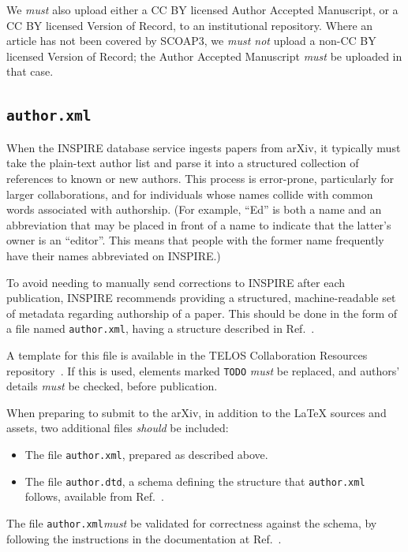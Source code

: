 \documentclass{article}
\newcommand\rfcword[1]{\emph{#1}\xspace}
\newcommand\must{\rfcword{must}}
\newcommand\mustnot{\rfcword{must not}}
\newcommand\should{\rfcword{should}}
\newcommand\filename[1]{\texttt{#1}\xspace}
\newcommand\authorxml{\filename{author.xml}}
\begin{document}
We \must also upload either a CC BY licensed Author Accepted Manuscript,
or a CC BY licensed Version of Record,
to an institutional repository.
Where an article has not been covered by SCOAP3,
we \mustnot upload a non-CC BY licensed Version of Record;
the Author Accepted Manuscript \must be uploaded in that case.


\subsection{\authorxml}

When the INSPIRE database service ingests papers from arXiv,
it typically must take the plain-text author list
and parse it into a structured collection of references to known or new authors.
This process is error-prone,
particularly for larger collaborations,
and for individuals whose names collide with common words associated with authorship.
(For example,
``Ed'' is both a name
and an abbreviation that may be placed in front of a name
to indicate that the latter's owner is an ``editor''.
This means that people with the former name frequently have their names abbreviated on INSPIRE.)

To avoid needing to manually send corrections to INSPIRE after each publication,
INSPIRE recommends providing
a structured, machine-readable set of metadata regarding authorship of a paper.
This should be done in the form of a file named \authorxml,
having a structure described in Ref.~\cite{inspire-authorxml}.

A template for this file is available in the TELOS Collaboration Resources repository~\cite{resources}.
If this is used,
elements marked \verb|TODO| \must be replaced,
and authors' details \must be checked,
before publication.

When preparing to submit to the arXiv,
in addition to the LaTeX sources and assets,
two additional files \should be included:

\begin{itemize}
  \item
        The file \authorxml,
        prepared as described above.
  \item
        The file \filename{author.dtd},
        a schema defining the structure that \authorxml follows,
        available from Ref.~\cite{inspire-authorxml}.
\end{itemize}

The file \authorxml \must be validated for correctness against the schema,
by following the instructions in the documentation at Ref.~\cite{inspire-authorxml}.
\end{document}
